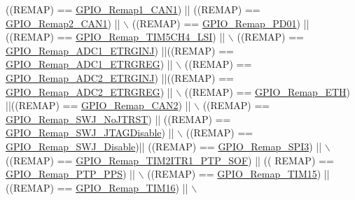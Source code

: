\begin{DoxyCode}
                              ((REMAP) == \hyperlink{group___g_p_i_o___remap__define_ga89ac81224968d8faf42475be664c1e09}{GPIO\_Remap1\_CAN1}) || ((REMAP) == 
      \hyperlink{group___g_p_i_o___remap__define_gad4f5b46cf24bed1563b22e6ecca3ebef}{GPIO\_Remap2\_CAN1}) || \(\backslash\)
                              ((REMAP) == \hyperlink{group___g_p_i_o___remap__define_gaeac44191de99d55a5fa03e29b74d5e59}{GPIO\_Remap\_PD01}) || ((REMAP) == 
      \hyperlink{group___g_p_i_o___remap__define_gad909488d0b7a0cfa1116a66e962e3c62}{GPIO\_Remap\_TIM5CH4\_LSI}) || \(\backslash\)
                              ((REMAP) == \hyperlink{group___g_p_i_o___remap__define_gaf79d966f49b64d3feb0ba9cc39294dac}{GPIO\_Remap\_ADC1\_ETRGINJ}) ||((REMAP) == 
      \hyperlink{group___g_p_i_o___remap__define_gab1d040cab5d9f16f362edc2e8b47a82a}{GPIO\_Remap\_ADC1\_ETRGREG}) || \(\backslash\)
                              ((REMAP) == \hyperlink{group___g_p_i_o___remap__define_gae00aaabeed54e805932ec6978acf000d}{GPIO\_Remap\_ADC2\_ETRGINJ}) ||((REMAP) == 
      \hyperlink{group___g_p_i_o___remap__define_gaa782a0c482f34507c82e4cd639bb747e}{GPIO\_Remap\_ADC2\_ETRGREG}) || \(\backslash\)
                              ((REMAP) == \hyperlink{group___g_p_i_o___remap__define_gaf578688bb4d1a17fb3a103946e7c2eb7}{GPIO\_Remap\_ETH}) ||((REMAP) == 
      \hyperlink{group___g_p_i_o___remap__define_ga14c09a5050063b703fa07181afc56ee6}{GPIO\_Remap\_CAN2}) || \(\backslash\)
                              ((REMAP) == \hyperlink{group___g_p_i_o___remap__define_ga81009ef35f7f039365291cf4f6fc0c5b}{GPIO\_Remap\_SWJ\_NoJTRST}) || ((REMAP) == 
      \hyperlink{group___g_p_i_o___remap__define_ga25fb8c789334694861444e48f486879d}{GPIO\_Remap\_SWJ\_JTAGDisable}) || \(\backslash\)
                              ((REMAP) == \hyperlink{group___g_p_i_o___remap__define_gaf4832412d0ba344bb9147142cfcda828}{GPIO\_Remap\_SWJ\_Disable})|| ((REMAP) == 
      \hyperlink{group___g_p_i_o___remap__define_gac7fd74244a9d53ca02cc86bb6543a689}{GPIO\_Remap\_SPI3}) || \(\backslash\)
                              ((REMAP) == \hyperlink{group___g_p_i_o___remap__define_ga0dc4bec540b9372479e63295fe68ac17}{GPIO\_Remap\_TIM2ITR1\_PTP\_SOF}) || ((
      REMAP) == \hyperlink{group___g_p_i_o___remap__define_ga3e9d7808d1e50393afde08e4a45d18aa}{GPIO\_Remap\_PTP\_PPS}) || \(\backslash\)
                              ((REMAP) == \hyperlink{group___g_p_i_o___remap__define_gaead5c447875e8b384945424845452b82}{GPIO\_Remap\_TIM15}) || ((REMAP) == 
      \hyperlink{group___g_p_i_o___remap__define_gac9d612f9f9f9f66faecbdbbc29d2ac61}{GPIO\_Remap\_TIM16}) || \(\backslash\)

\end{DoxyCode}
